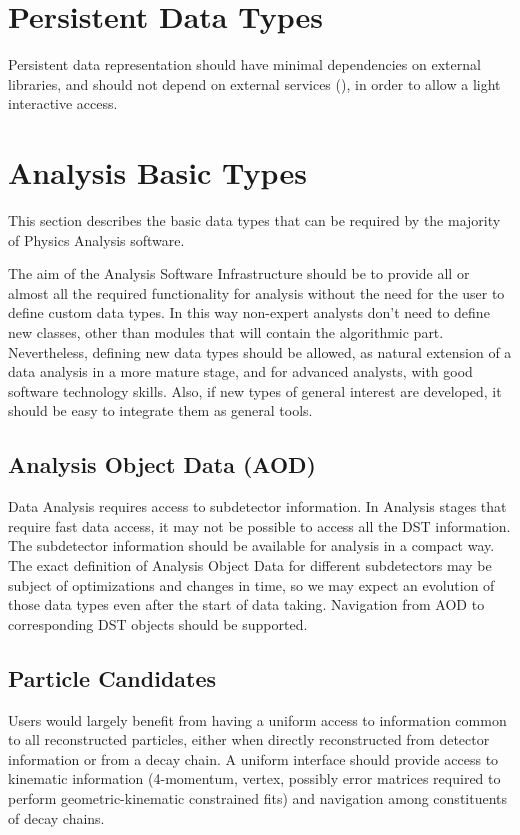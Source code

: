 \documentclass[draftmode]{memarticle}
\begin{document}
\section{Persistent Data Types}

Persistent data representation should have minimal
dependencies on external libraries, and should not
depend on external services (), in order to
allow a light interactive access.

\section{Analysis Basic Types}

This section describes the basic data types
that can be required by the majority of Physics Analysis 
software.

The aim of the Analysis Software Infrastructure
should be to provide all or almost all the required
functionality for analysis without the need for
the user to define custom data types. 
In this way non-expert analysts don't need 
to define new classes, other than modules
that will contain the algorithmic part.
Nevertheless, defining new data types should be 
allowed, as natural extension of a data analysis in 
a more mature stage, and for advanced analysts, with
good software technology skills. Also, if new types of general interest are
developed, it should be easy to integrate them 
as general tools.

\subsection{Analysis Object Data (AOD)}

Data Analysis requires access to subdetector information.
In Analysis stages that require fast data access, 
it may not be possible to access all the DST information.
The subdetector information should be available for
analysis in a compact way.
The exact definition 
of Analysis Object Data for different subdetectors
may be subject of optimizations and changes in time,
so we may expect an evolution of those data types 
even after the start of data taking.
Navigation from AOD to corresponding DST objects should
be supported.

\subsection{Particle Candidates}
Users would largely benefit from having a uniform access to information
common to all reconstructed particles, either when 
directly reconstructed from detector information 
or from a decay chain. A uniform interface should
provide access to kinematic information (4-momentum, vertex,
possibly error matrices required to perform
geometric-kinematic constrained fits) and navigation
among constituents of decay chains.
\end{document}
